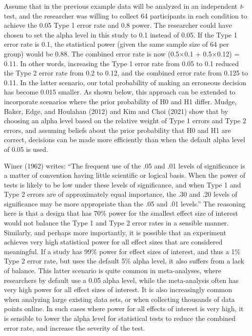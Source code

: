 \documentclass[
  english,
  ,jou, a4paper,floatsintext]{apa6}
\begin{document}
Assume that in the previous example data will be analyzed in an independent \emph{t}-test, and the researcher was willing to collect 64 participants in each condition to achieve the 0.05 Type 1 error rate and 0.8 power. The researcher could have chosen to set the alpha level in this study to 0.1 instead of 0.05. If the Type 1 error rate is 0.1, the statistical power (given the same sample size of 64 per group) would be 0.88. The combined error rate is now (0.5×0.1 + 0.5×0.12) = 0.11. In other words, increasing the Type 1 error rate from 0.05 to 0.1 reduced the Type 2 error rate from 0.2 to 0.12, and the combined error rate from 0.125 to 0.11. In the latter scenario, our total probability of making an erroneous decision has become 0.015 smaller. As shown below, this approach can be extended to incorporate scenarios where the prior probability of H0 and H1 differ. Mudge, Baker, Edge, and Houlahan (2012) and Kim and Choi (2021) show that by choosing an alpha level based on the relative weight of Type 1 errors and Type 2 errors, and assuming beliefs about the prior probability that H0 and H1 are correct, decisions can be made more efficiently than when the default alpha level of 0.05 is used.

Winer (1962) writes: ``The frequent use of the .05 and .01 levels of significance is a matter of convention having little scientific or logical basis. When the power of tests is likely to be low under these levels of significance, and when Type 1 and Type 2 errors are of approximately equal importance, the .30 and .20 levels of significance may be more appropriate than the .05 and .01 levels.'' The reasoning here is that a design that has 70\% power for the smallest effect size of interest would not balance the Type 1 and Type 2 error rates in a sensible manner. Similarly, and perhaps more importantly, it is possible that an experiment achieves very high statistical power for all effect sizes that are considered meaningful. If a study has 99\% power for effect sizes of interest, and thus a 1\% Type 2 error rate, but uses the default 5\% alpha level, it also suffers from a lack of balance. This latter scenario is quite common in meta-analyses, where researchers by default use a 0.05 alpha level, while the meta-analysis often has very high power for all effect sizes of interest. It is also increasingly common when analyzing large existing data sets, or when collecting thousands of data points online. In such cases where power for all effects of interest is very high, it is sensible to lower the alpha level for statistical tests to reduce the combined error rate, and increase the severity of the test.
\end{document}
